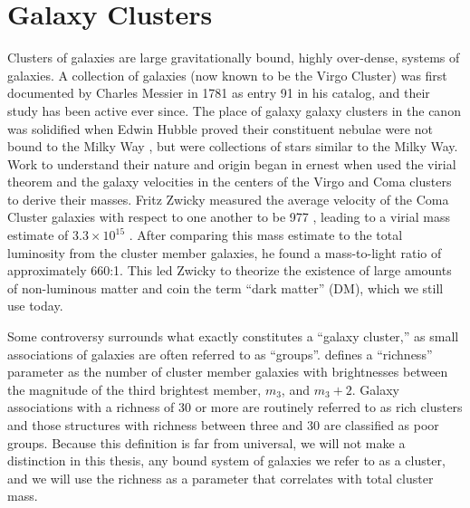 \section{Galaxy Clusters}
Clusters of galaxies are large gravitationally bound, highly over-dense, systems of galaxies. A collection of galaxies (now known to be the Virgo Cluster) was first documented by Charles Messier in 1781 as entry 91 in his catalog, and their study has been active ever since. The place of galaxy galaxy clusters in the canon was solidified when Edwin Hubble proved their constituent nebulae were not bound to the Milky Way \citep{Hubble1926}, but were collections of stars similar to the Milky Way. Work to understand their nature and origin began in ernest when \cite{Hubble1931} used the virial theorem and the galaxy velocities in the centers of the Virgo \citep{Smith1936} and Coma \citep{Zwicky1933} clusters to derive their masses. Fritz Zwicky measured the average velocity of the Coma Cluster galaxies with respect to one another to be 977 \kms, leading to a virial mass estimate of $3.3 \times 10^{15}$ \Msol. After comparing this mass estimate to the total luminosity from the cluster member galaxies, he found a mass-to-light ratio of approximately 660:1. This led Zwicky to theorize the existence of large amounts of non-luminous matter and coin the term ``dark matter'' (DM), which we still use today.  

Some controversy surrounds what exactly constitutes a ``galaxy cluster,'' as small associations of galaxies are often referred to as ``groups''. \cite{Abell1958} defines a ``richness'' parameter as the number of cluster member galaxies with brightnesses between the magnitude of the third brightest member, $m_3$, and $m_3 + 2$. Galaxy associations with a richness of 30 or more are routinely referred to as rich clusters and those structures with richness between three and 30 are classified as poor groups. Because this definition is far from universal, we will not make a distinction in this thesis, any bound system of galaxies we refer to as a cluster, and we will use the richness as a parameter that correlates with total cluster mass.

